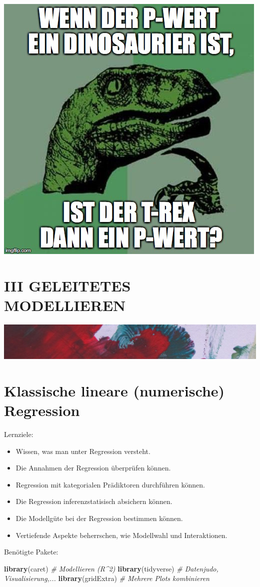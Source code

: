 \documentclass[12pt,ngerman,]{book}
\newenvironment{Shaded}{\begin{snugshade}}{\end{snugshade}}
\newcommand{\KeywordTok}[1]{\textcolor[rgb]{0.13,0.29,0.53}{\textbf{{#1}}}}
\newcommand{\CommentTok}[1]{\textcolor[rgb]{0.56,0.35,0.01}{\textit{{#1}}}}
\newcommand{\NormalTok}[1]{{#1}}
\providecommand{\tightlist}{%
  \setlength{\itemsep}{0pt}\setlength{\parskip}{0pt}}
\renewenvironment{Shaded}{\begin{kframe}}{\end{kframe}}
\let\BeginKnitrBlock\begin \let\EndKnitrBlock\end
\begin{document}
\begin{center}\includegraphics[width=0.3\linewidth]{images/meme_pwert_1iw22a_pvalue_dino} \end{center}

\chapter*{III GELEITETES MODELLIEREN}\label{iii-geleitetes-modellieren}

\includegraphics[width=1\linewidth]{images/farb1}

\chapter{Klassische lineare (numerische)
Regression}\label{klassische-lineare-numerische-regression}

\BeginKnitrBlock{rmdcaution}
Lernziele:

\begin{itemize}
\tightlist
\item
  Wissen, was man unter Regression versteht.
\item
  Die Annahmen der Regression überprüfen können.
\item
  Regression mit kategorialen Prädiktoren durchführen können.
\item
  Die Regression inferenzstatisisch absichern können.
\item
  Die Modellgüte bei der Regression bestimmen können.
\item
  Vertiefende Aspekte beherrschen, wie Modellwahl und Interaktionen.
\end{itemize}
\EndKnitrBlock{rmdcaution}

Benötigte Pakete:

\begin{Shaded}
\begin{Highlighting}[]
\KeywordTok{library}\NormalTok{(caret)  }\CommentTok{# Modellieren (R^2)}
\KeywordTok{library}\NormalTok{(tidyverse)  }\CommentTok{# Datenjudo, Visualisierung,...}
\KeywordTok{library}\NormalTok{(gridExtra)  }\CommentTok{# Mehrere Plots kombinieren}
\end{Highlighting}
\end{Shaded}
\end{document}

